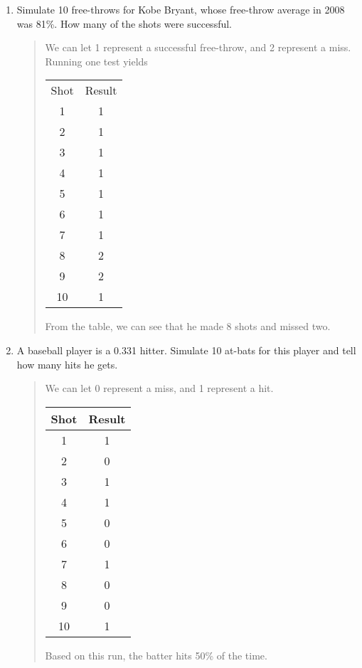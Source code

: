 \documentclass{hw}
\begin{document}
\begin{enumerate}
\newpage
\item Simulate 10 free-throws for Kobe Bryant, whose free-throw average in 2008 was 81\%. How many
of the shots were successful.
\begin{quote}
We can let 1 represent a successful free-throw, and 2 represent a miss. Running one test yields
\begin{center}
\begin{tabular}{c | c}
Shot & Result\\
1 & 1\\
2 & 1\\
3 & 1\\
4 & 1\\
5 & 1\\
6 & 1\\
7 & 1\\
8 & 2\\
9 & 2\\
10 & 1
\end{tabular}
\end{center}
From the table, we can see that he made 8 shots and missed two.
\end{quote}

\item A baseball player is a 0.331 hitter. Simulate 10 at-bats for this player and tell how many hits he
gets.
\begin{quote}
We can let 0 represent a miss, and 1 represent a hit.
\begin{center}
\begin{tabular}{c | c}
Shot & Result\\
\hline
1 & 1\\
2 & 0\\
3 & 1\\
4 & 1\\
5 & 0\\
6 & 0\\
7 & 1\\
8 & 0\\
9 & 0\\
10 & 1
\end{tabular}
\end{center}
Based on this run, the batter hits 50\% of the time.
\end{quote}


\end{enumerate}
\end{document}

